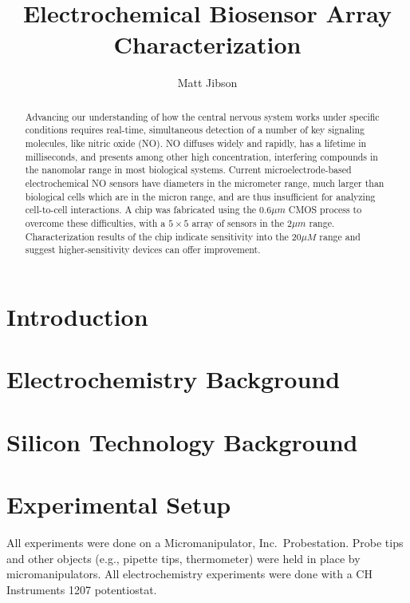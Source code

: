 \documentclass[twocolumn]{article}
\begin{document}
\title{Electrochemical Biosensor Array Characterization}
\author{Matt Jibson}

\maketitle{}

\begin{abstract}

Advancing our understanding of how the central nervous system works under specific conditions requires real-time, simultaneous detection of a number of key signaling molecules, like nitric oxide (NO). NO diffuses widely and rapidly, has a lifetime in milliseconds, and presents among other high concentration, interfering compounds in the nanomolar range in most biological systems. Current microelectrode-based electrochemical NO sensors have diameters in the micrometer range, much larger than biological cells which are in the micron range, and are thus insufficient for analyzing cell-to-cell interactions. A chip was fabricated using the $0.6\mu m$ CMOS process to overcome these difficulties, with a $5 \times 5$ array of sensors in the 2$\mu m$ range. Characterization results of the chip indicate sensitivity into the 20$\mu M$ range and suggest higher-sensitivity devices can offer improvement.

\end{abstract}

\section{Introduction}

\section{Electrochemistry Background}

\section{Silicon Technology Background}

\section{Experimental Setup}

All experiments were done on a Micromanipulator, Inc.\ Probestation. Probe tips and other objects (e.g., pipette tips, thermometer) were held in place by micromanipulators. All electrochemistry experiments were done with a CH Instruments 1207 potentiostat.
\end{document}
